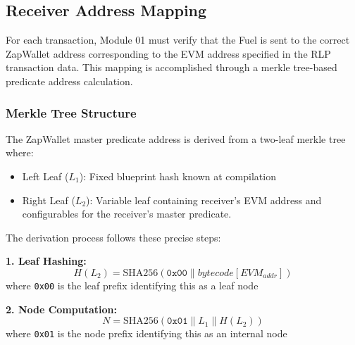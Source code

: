 
\subsection{Receiver Address Mapping}
For each transaction, Module 01 must verify that the Fuel  is sent to the correct ZapWallet address corresponding
to the EVM address specified in the RLP transaction data. This mapping is accomplished through a merkle tree-based predicate address calculation.

\subsubsection{Merkle Tree Structure}
The ZapWallet master predicate address is derived from a two-leaf merkle tree where:
\begin{itemize}
    \item Left Leaf ($L_1$): Fixed blueprint hash known at compilation
    \item Right Leaf ($L_2$): Variable leaf containing receiver's EVM address and configurables for the receiver's master predicate.
\end{itemize}



The derivation process follows these precise steps:

\textbf{1. Leaf Hashing:}
\[ H(L_2) = \text{SHA256}(\texttt{0x00} \parallel bytecode[EVM_{addr}]) \]
where \texttt{0x00} is the leaf prefix identifying this as a leaf node

\textbf{2. Node Computation:}
\[ N = \text{SHA256}(\texttt{0x01} \parallel L_1 \parallel H(L_2)) \]
where \texttt{0x01} is the node prefix identifying this as an internal node

